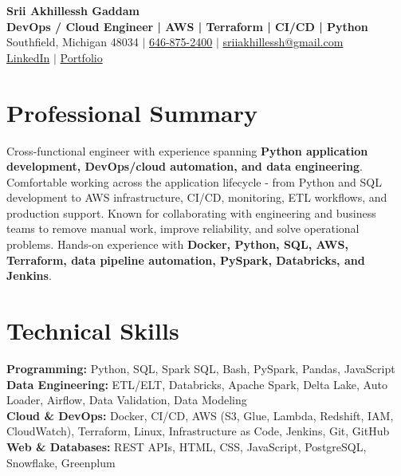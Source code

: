 \documentclass[letterpaper,10pt]{article}
\begin{document}
\fontsize{9.35pt}{10.45pt}\selectfont

\begin{center}
    {\LARGE \textbf{Srii Akhillessh Gaddam}} \\[-1pt]
    \textbf{DevOps / Cloud Engineer | AWS | Terraform | CI/CD | Python} \\[2pt]
    Southfield, Michigan 48034 $|$
    \href{tel:6468752400}{646-875-2400} $|$
    \href{mailto:sriiakhillessh@gmail.com}{sriiakhillessh@gmail.com} \\[1pt]
    \href{https://www.linkedin.com/in/srii-akhiilessh-gaddam-b48668191/}{LinkedIn} $|$
    \href{https://sriiakhillesshg.github.io/portfolio/}{Portfolio}
\end{center}
\vspace{-8pt}

\section{Professional Summary}
\small{Cross-functional engineer with experience spanning \textbf{Python application development, DevOps/cloud automation, and data engineering}. Comfortable working across the application lifecycle - from Python and SQL development to AWS infrastructure, CI/CD, monitoring, ETL workflows, and production support. Known for collaborating with engineering and business teams to remove manual work, improve reliability, and solve operational problems. Hands-on experience with \textbf{Docker, Python, SQL, AWS, Terraform, data pipeline automation, PySpark, Databricks, and Jenkins}.}

\section{Technical Skills}
\small{
\textbf{Programming:} Python, SQL, Spark SQL, Bash, PySpark, Pandas, JavaScript \\
\textbf{Data Engineering:} ETL/ELT, Databricks, Apache Spark, Delta Lake, Auto Loader, Airflow, Data Validation, Data Modeling \\
\textbf{Cloud \& DevOps:} Docker, CI/CD, AWS (S3, Glue, Lambda, Redshift, IAM, CloudWatch), Terraform, Linux, Infrastructure as Code, Jenkins, Git, GitHub \\
\textbf{Web \& Databases:} REST APIs, HTML, CSS, JavaScript, PostgreSQL, Snowflake, Greenplum
}
\end{document}
